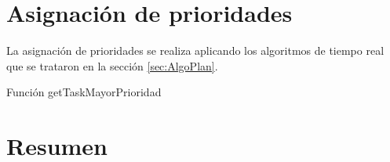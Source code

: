
    	
\section{Asignación de prioridades} \label{secc:asigPrioridad}

La asignación de prioridades se realiza aplicando los algoritmos de tiempo real que se trataron en la sección \ref{sec:AlgoPlan}.

Función getTaskMayorPrioridad



\section{Resumen}




